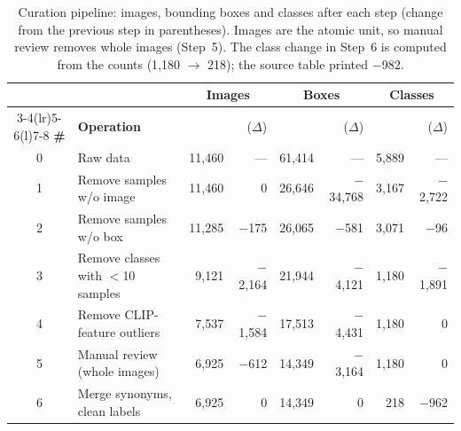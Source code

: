 \begin{table}[t]
  \centering
  \caption{Curation pipeline: images, bounding boxes and classes after each step (change from the previous step in parentheses). Images are the atomic unit, so manual review removes whole images (Step~5). The class change in Step~6 is computed from the counts (1,180 $\to$ 218); the source table printed $-$982.}
  \label{tab:curation}
  \small
  \setlength{\tabcolsep}{7pt}
  \begin{tabular}{@{}cl rr rr rr@{}}
    \toprule
    & & \multicolumn{2}{c}{\textbf{Images}} & \multicolumn{2}{c}{\textbf{Boxes}} & \multicolumn{2}{c}{\textbf{Classes}} \\
    \cmidrule(lr){3-4}\cmidrule(lr){5-6}\cmidrule(l){7-8}
    \textbf{\#} & \textbf{Operation} & & ($\Delta$) & & ($\Delta$) & & ($\Delta$) \\
    \midrule
    0 & Raw data                       & 11,460 & ---     & 61,414 & ---      & 5,889 & ---    \\
    1 & Remove samples w/o image       & 11,460 & 0       & 26,646 & $-$34,768 & 3,167 & $-$2,722 \\
    2 & Remove samples w/o box         & 11,285 & $-$175  & 26,065 & $-$581   & 3,071 & $-$96  \\
    3 & Remove classes with $<$10 samples & 9,121 & $-$2,164 & 21,944 & $-$4,121 & 1,180 & $-$1,891 \\
    4 & Remove CLIP-feature outliers   & 7,537  & $-$1,584 & 17,513 & $-$4,431 & 1,180 & 0      \\
    5 & Manual review (whole images)   & 6,925  & $-$612  & 14,349 & $-$3,164 & 1,180 & 0      \\
    6 & Merge synonyms, clean labels   & 6,925  & 0       & 14,349 & 0        & 218   & $-$962 \\
    \bottomrule
  \end{tabular}
\end{table}
